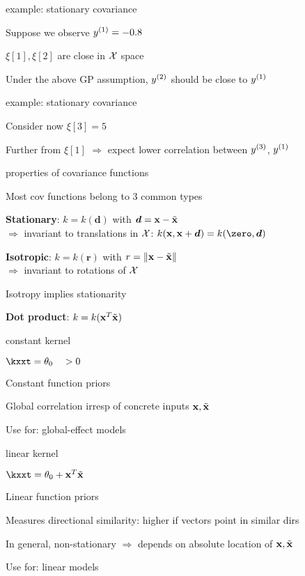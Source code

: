 \documentclass[11pt,compress,t,notes=noshow, xcolor=table]{beamer}
\begin{document}
\begin{framei}{example: stationary covariance}
\item Suppose we observe $\yi[1] = -0.8$
\item $\xi[1], \xi[2]$ are close in $\Xspace$ space
\item Under the above GP assumption, $\yi[2]$ should be close to $\yi[1]$ 
\vfill
{}
\end{framei}

\begin{framei}{example: stationary covariance}
\item Consider now $\xi[3] = 5$
\item Further from $\xi[1]$ $\Rightarrow$ expect lower correlation between $\yi[3]$, $\yi[1]$ 
\vfill
{}
\end{framei}

\begin{framei}[sep=L]{properties of covariance functions}
\item Most cov functions belong to 3 common types
\item \textbf{Stationary}: $k = k(\bm{d})$ with $\bm{d} = \xv - \xtil$ \\
$\Rightarrow$ invariant to translations in $\Xspace$: $k(\xv, \xv + \bm{d}) = k(\zero, \bm{d})$
\item \textbf{Isotropic}: $k = k(\bm{r})$ with $r = \xxtnorm$ \\
$\Rightarrow$ invariant to rotations of $\Xspace$
\item Isotropy implies stationarity
\item \textbf{Dot product}: $k = k(\xv^T \xtil)$
\end{framei}

\begin{framei}{constant kernel}
\item $\kxxt = \theta_0 \quad > 0$
\item Constant function priors
\item Global correlation irresp of concrete inputs $\xv, \xtil$
\item Use for: global-effect models
\end{framei}

\begin{framei}{linear kernel}
\item $\kxxt = \theta_0 + \xv^T \xtil$
\item Linear function priors
\item Measures directional similarity: higher if vectors point in similar dirs
\item In general, non-stationary $\Rightarrow$ depends on absolute location of $\xv, \xtil$
\item Use for: linear models
\end{framei}
\end{document}
